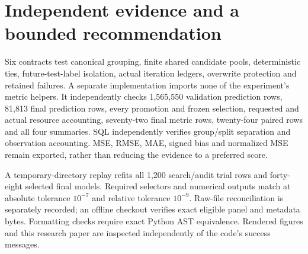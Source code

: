 \documentclass[11pt]{article}
\begin{document}
\section{Independent evidence and a bounded recommendation}
Six contracts test canonical grouping, finite shared candidate pools, deterministic ties, future-test-label isolation, actual iteration ledgers, overwrite protection and retained failures. A separate implementation imports none of the experiment's metric helpers. It independently checks 1,565,550 validation prediction rows, 81,813 final prediction rows, every promotion and frozen selection, requested and actual resource accounting, seventy-two final metric rows, twenty-four paired rows and all four summaries. SQL independently verifies group/split separation and observation accounting. MSE, RMSE, MAE, signed bias and normalized MSE remain exported, rather than reducing the evidence to a preferred score.

A temporary-directory replay refits all 1,200 search/audit trial rows and forty-eight selected final models. Required selectors and numerical outputs match at absolute tolerance $10^{-7}$ and relative tolerance $10^{-9}$. Raw-file reconciliation is separately recorded; an offline checkout verifies exact eligible panel and metadata bytes. Formatting checks require exact Python AST equivalence. Rendered figures and this research paper are inspected independently of the code's success messages.
\end{document}
